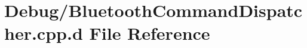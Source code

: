 \hypertarget{_debug_2_bluetooth_command_dispatcher_8cpp_8d}{\section{\-Debug/\-Bluetooth\-Command\-Dispatcher.cpp.\-d \-File \-Reference}
\label{_debug_2_bluetooth_command_dispatcher_8cpp_8d}
}
